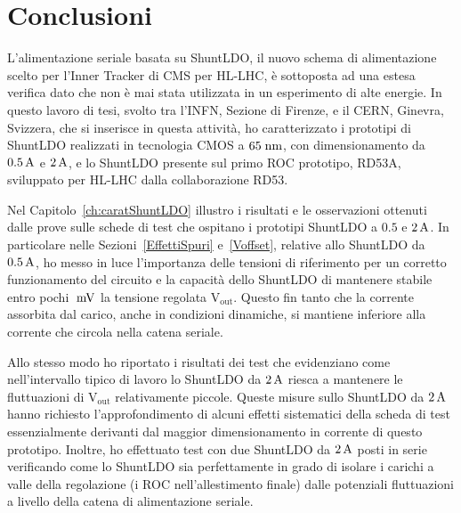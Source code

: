 \chapter{Conclusioni}

L'alimentazione seriale basata su ShuntLDO, il nuovo schema di alimentazione scelto per l'Inner Tracker di CMS per HL-LHC, \`e sottoposta ad una estesa verifica dato che non \`e mai stata utilizzata in un esperimento di alte energie. In questo lavoro di tesi, svolto tra l'INFN, Sezione di Firenze, e il CERN, Ginevra, Svizzera, che si inserisce in questa attivit\`a, ho  caratterizzato i prototipi di ShuntLDO realizzati in tecnologia CMOS a $65\rm \; nm$, con dimensionamento da $0.5\rm \, A$ e $2\rm \, A$, e lo ShuntLDO presente sul primo ROC prototipo, RD53A, sviluppato per HL-LHC dalla collaborazione RD53.




Nel Capitolo~\ref{ch:caratShuntLDO} illustro i risultati e le osservazioni ottenuti dalle prove sulle schede di test che ospitano i prototipi ShuntLDO a $0.5$ e $2\rm \, A$. 
In particolare nelle Sezioni~\ref{EffettiSpuri} e~\ref{Voffset}, relative allo ShuntLDO da $0.5\rm \, A$, ho messo in luce l'importanza delle tensioni di riferimento per un corretto funzionamento del circuito e la capacità dello ShuntLDO di mantenere stabile entro pochi $\rm \; mV$ la tensione regolata $\mathrm{V_{out}}$. 
Questo fin tanto che la corrente assorbita dal carico, anche in condizioni dinamiche, si mantiene inferiore alla corrente che circola nella catena seriale.

Allo stesso modo ho riportato i risultati dei test che evidenziano come nell'intervallo tipico di lavoro lo ShuntLDO da $2\rm \, A$ riesca a mantenere le fluttuazioni di $\mathrm{V_{out}}$ relativamente piccole. Queste misure sullo ShuntLDO da $2\rm \, A$ hanno richiesto l'approfondimento di alcuni effetti sistematici della scheda di test essenzialmente derivanti dal maggior dimensionamento in corrente di questo prototipo. 
Inoltre, ho effettuato test con due ShuntLDO da $2\rm \, A$ posti in serie verificando come lo ShuntLDO sia perfettamente in grado di isolare i carichi a valle della regolazione (i ROC nell'allestimento finale) dalle potenziali fluttuazioni a livello della catena di alimentazione seriale.

